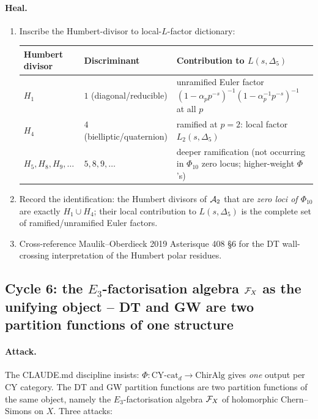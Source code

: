 \paragraph{Heal.}
\begin{enumerate}[label=(H\arabic*),leftmargin=1.5em]
\item Inscribe the Humbert-divisor to local-$L$-factor dictionary:
\begin{center}
\begin{tabular}{@{}lll@{}}
\hline
Humbert divisor & Discriminant & Contribution to $L(s,\Delta_5)$\\
\hline
$H_1$ & $1$ (diagonal/reducible) & unramified Euler factor
$(1-\alpha_p p^{-s})^{-1}(1-\alpha_p^{-1}p^{-s})^{-1}$ at all $p$\\
$H_4$ & $4$ (bielliptic/quaternion) & ramified at $p=2$:
local factor $L_2(s,\Delta_5)$\\
$H_5, H_8, H_9,\ldots$ & $5,8,9,\ldots$ & deeper ramification
(not occurring in $\Phi_{10}$ zero locus; higher-weight $\Phi$'s)\\
\hline
\end{tabular}
\end{center}
\item Record the identification: the Humbert divisors of
  $\mathcal{A}_2$ that are \emph{zero loci of $\Phi_{10}$} are exactly
  $H_1\cup H_4$; their local contribution to $L(s,\Delta_5)$ is
  the complete set of ramified/unramified Euler factors.
\item Cross-reference Maulik--Oberdieck 2019 Asterisque 408 \S6
  for the DT wall-crossing interpretation of the Humbert polar
  residues.
\end{enumerate}

\subsection*{Cycle 6: the $E_3$-factorisation algebra $\mathcal{F}_X$ as
the unifying object -- DT and GW are two partition functions of
one structure}
\label{sec:w14a14-cycle-6}

\paragraph{Attack.}
The CLAUDE.md discipline insists: $\Phi:\mathrm{CY}\text{-cat}_d\to\mathrm{ChirAlg}$
gives \emph{one} output per CY category. The DT and GW partition
functions are two partition functions of the same object, namely
the $E_3$-factorisation algebra $\mathcal{F}_X$ of holomorphic Chern--Simons
on $X$. Three attacks:

